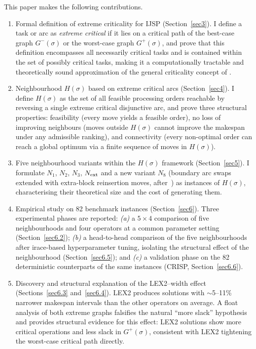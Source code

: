 \documentclass[preprint,12pt]{elsarticle}
\begin{document}
This paper makes the following contributions.
\begin{enumerate}
\item Formal definition of extreme criticality for IJSP (Section~\ref{sec3}). I define a task or arc as \emph{extreme critical} if it lies on a critical path of the best-case graph $G^-(\sigma)$ or the worst-case graph $G^+(\sigma)$, and prove that this definition encompasses all necessarily critical tasks and is contained within the set of possibly critical tasks, making it a computationally tractable and theoretically sound approximation of the general criticality concept of \cite{Artigues2015}.

\item Neighbourhood $H(\sigma)$ based on extreme critical arcs (Section~\ref{sec4}). I define $H(\sigma)$ as the set of all feasible processing orders reachable by reversing a single extreme critical disjunctive arc, and prove three structural properties: feasibility (every move yields a feasible order), no loss of improving neighbours (moves outside $H(\sigma)$ cannot improve the makespan under any admissible ranking), and connectivity (every non-optimal order can reach a global optimum via a finite sequence of moves in $H(\sigma)$).

\item Five neighbourhood variants within the $H(\sigma)$ framework (Section~\ref{sec5}). I formulate $N_1$, $N_2$, $N_3$, $N_{\rm ext}$ and a new variant $N_8$ (boundary arc swaps extended with extra-block reinsertion moves, after~\cite{Xie2022}) as instances of $H(\sigma)$, characterising their theoretical size and the cost of generating them.

\item Empirical study on 82 benchmark instances (Section~\ref{sec6}). Three experimental phases are reported: \emph{(a)} a $5 \times 4$ comparison of five neighbourhoods and four operators at a common parameter setting (Section~\ref{sec6.2}); \emph{(b)} a head-to-head comparison of the five neighbourhoods after irace-based hyperparameter tuning, isolating the structural effect of the neighbourhood (Section~\ref{sec6.5}); and \emph{(c)} a validation phase on the 82 deterministic counterparts of the same instances (CRISP, Section~\ref{sec6.6}).

\item Discovery and structural explanation of the LEX2--width effect (Sections~\ref{sec6.3} and~\ref{sec6.4}). LEX2 produces solutions with $\sim$5--11\% narrower makespan intervals than the other operators on average. A float analysis of both extreme graphs falsifies the natural ``more slack'' hypothesis and provides structural evidence for this effect: LEX2 solutions show more critical operations and less slack in $G^+(\sigma)$, consistent with LEX2 tightening the worst-case critical path directly.
\end{enumerate}
\end{document}

